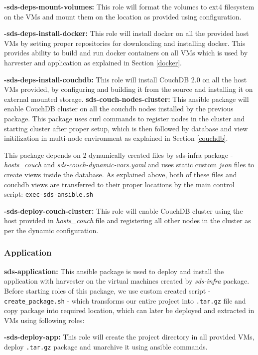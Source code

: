 \textbf{-sds-deps-mount-volumes:} This role will format the volumes to ext4 filesystem on the VMs and mount them on the location as provided using configuration.

\textbf{-sds-deps-install-docker:} This role will install docker on all the provided host VMs by setting proper repositories for downloading and installing docker. This provides ability to build and run docker containers on all VMs which is used by harvester and application as explained in Section \ref{docker}.

\textbf{-sds-deps-install-couchdb:} This role will install CouchDB 2.0 on all the host VMs provided, by configuring and building it from the source and installing it on external mounted storage. 
\newline
\newline
\textbf{sds-couch-nodes-cluster:} This ansible package will enable CouchDB cluster on all the couchdb nodes installed by the previous package. This package uses curl commands to register nodes in the cluster and starting cluster after proper setup, which is then followed by database and view initilization in multi-node environment as explained in Section \ref{couchdb}.

This package depends on 2 dynamically created files by sds-infra package - \emph{hosts\_couch} and \emph{sds-couch-dynamic-vars.yaml} and uses static custom \emph{json} files to create views inside the database. As explained above, both of these files and couchdb views are transferred to their proper locations by the main control script: \texttt{exec-sds-ansible.sh}

\textbf{-sds-deploy-couch-cluster:} This role will enable CouchDB cluster using the host provided in \emph{hosts\_couch} file and registering all other nodes in the cluster as per the dynamic configuration.

\subsubsection{Application}
\textbf{sds-application:} This ansible package is used to deploy and install the application with harvester on the virtual machines created by \emph{sds-infra} package. Before starting roles of this package, we use custom created script - \texttt{create\_package.sh} - which transforms our entire project into \texttt{.tar.gz} file and copy package into required location, which can later be deployed and extracted in VMs using following roles:

\textbf{-sds-deploy-app:} This role will create the project directory in all provided VMs, deploy \texttt{.tar.gz} package and unarchive it using ansible commands.

